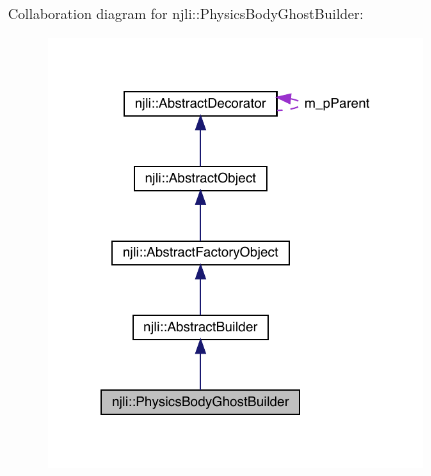 Collaboration diagram for njli\+:\+:Physics\+Body\+Ghost\+Builder\+:\nopagebreak
\begin{figure}[H]
\begin{center}
\leavevmode
\includegraphics[width=281pt]{classnjli_1_1_physics_body_ghost_builder__coll__graph}
\end{center}
\end{figure}
